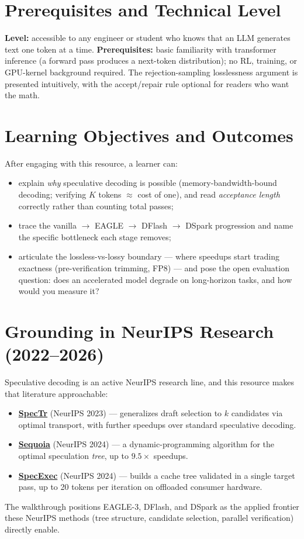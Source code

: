 \documentclass{article}
\begin{document}
\section{Prerequisites and Technical Level}
\textbf{Level:} accessible to any engineer or student who knows that an LLM generates text one token at a time. \textbf{Prerequisites:} basic familiarity with transformer inference (a forward pass produces a next-token distribution); no RL, training, or GPU-kernel background required. The rejection-sampling losslessness argument is presented intuitively, with the accept/repair rule optional for readers who want the math.

\section{Learning Objectives and Outcomes}
After engaging with this resource, a learner can:
\begin{itemize}
  \item explain \emph{why} speculative decoding is possible (memory-bandwidth-bound decoding; verifying $K$ tokens $\approx$ cost of one), and read \emph{acceptance length} correctly rather than counting total passes;
  \item trace the vanilla $\to$ EAGLE $\to$ DFlash $\to$ DSpark progression and name the specific bottleneck each stage removes;
  \item articulate the lossless-vs-lossy boundary --- where speedups start trading exactness (pre-verification trimming, FP8) --- and pose the open evaluation question: does an accelerated model degrade on long-horizon tasks, and how would you measure it?
\end{itemize}

\section{Grounding in NeurIPS Research (2022--2026)}
Speculative decoding is an active NeurIPS research line, and this resource makes that literature approachable:
\begin{itemize}\small
  \item \href{https://neurips.cc/virtual/2023/poster/71597}{\textbf{SpecTr}} (NeurIPS 2023) --- generalizes draft selection to $k$ candidates via optimal transport, with further speedups over standard speculative decoding.
  \item \href{https://proceedings.neurips.cc/paper_files/paper/2024/hash/ea1f5f0878d43ff4fb8bf64ef4a2326c-Abstract-Conference.html}{\textbf{Sequoia}} (NeurIPS 2024) --- a dynamic-programming algorithm for the optimal speculation \emph{tree}, up to $9.5\times$ speedups.
  \item \href{https://neurips.cc/virtual/2024/poster/95733}{\textbf{SpecExec}} (NeurIPS 2024) --- builds a cache tree validated in a single target pass, up to 20 tokens per iteration on offloaded consumer hardware.
\end{itemize}
The walkthrough positions EAGLE-3, DFlash, and DSpark as the applied frontier these NeurIPS methods (tree structure, candidate selection, parallel verification) directly enable.
\end{document}
